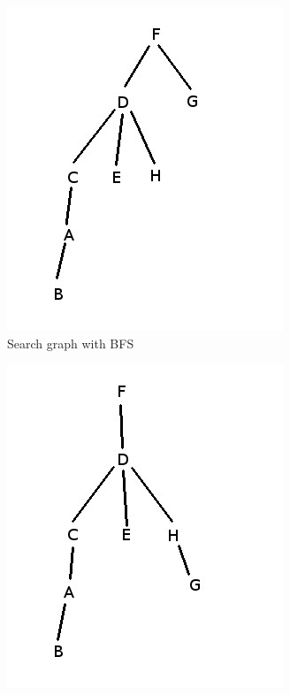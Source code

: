 \documentclass[12pt]{article}
\begin{document}
\begin{figure}
    \begin{subfigure}[t]{.49\textwidth}
        \centering
        \includegraphics[width=\linewidth]{img/bfs}
        \caption{Search graph with BFS}
        \label{fig_bfs}
    \end{subfigure}\hfill
    \begin{subfigure}[t]{.49\textwidth}
        \centering
        \includegraphics[width=\linewidth]{img/dfs}

\end{subfigure}
\end{figure}
\end{document}
